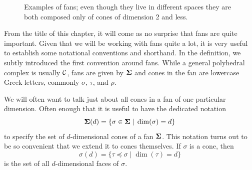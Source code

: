 \documentclass[12pt,oneside]{../../sfsuthesis}
\begin{document}
\begin{figure}[H]
\begin{subfigure}{0.48\textwidth}
    \end{subfigure}
    \caption{Examples of fans; even though they live in different spaces they are both composed only of cones of dimension 2 and less.}
    \label{fig:fans}
\end{figure}
From the title of this chapter, it will come as no surprise that fans are quite important.
Given that we will be working with fans quite a lot, it is very useful to establish some notational conventions and shorthand.
In the definition, we subtly introduced the first convention around fans.
While a general polyhedral complex is usually \( \mathcal{C} \), fans are given by \( {\bm{\Sigma}} \) and cones in the fan are lowercase Greek letters, commonly \( \sigma,\,\tau\), and \( \rho \).

We will often want to talk just about all cones in a fan of one particular dimension.
Often enough that it is useful to have the dedicated notation
\[
    {\bm{\Sigma}}(d) = \{ \sigma \in {\bm{\Sigma}} \; | \; \dim(\sigma) = d \}
\]
to specify the set of \( d \)-dimensional cones of a fan \( {\bm{\Sigma}} \).
This notation turns out to be so convenient that we extend it to cones themselves.
If \( \sigma \) is a cone, then
\[
    \sigma(d) = \{ \tau \preceq \sigma \; | \; \dim(\tau) = d \}
\]
is the set of all \( d \)-dimensional faces of \( \sigma \).
\end{document}

